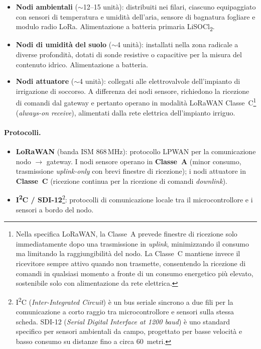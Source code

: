 \begin{itemize}
	\item \textbf{Nodi ambientali} ($\sim$12--15 unità): distribuiti nei filari, ciascuno equipaggiato con sensori di temperatura e umidità dell'aria, sensore di bagnatura fogliare e modulo radio LoRa. Alimentazione a batteria primaria LiSOCl\textsubscript{2}.

	\item \textbf{Nodi di umidità del suolo} ($\sim$4 unità): installati nella zona radicale a diverse profondità, dotati di sonde resistive o capacitive per la misura del contenuto idrico. Alimentazione a batteria.

	\item \textbf{Nodi attuatore} ($\sim$4 unità): collegati alle elettrovalvole dell'impianto di irrigazione di soccorso. A differenza dei nodi sensore, richiedono la ricezione di comandi dal gateway e pertanto operano in modalità LoRaWAN Classe~C\footnote{Nella specifica LoRaWAN, la Classe~A prevede finestre di ricezione solo immediatamente dopo una trasmissione in \textit{uplink}, minimizzando il consumo ma limitando la raggiungibilità del nodo. La Classe~C mantiene invece il ricevitore sempre attivo quando non trasmette, consentendo la ricezione di comandi in qualsiasi momento a fronte di un consumo energetico più elevato, sostenibile solo con alimentazione da rete elettrica.} (\textit{always-on receive}), alimentati dalla rete elettrica dell'impianto irriguo.
\end{itemize}

\paragraph{Protocolli.}

\begin{itemize}
	\item \textbf{LoRaWAN} (banda ISM 868\,MHz): protocollo LPWAN per la comunicazione nodo $\rightarrow$ gateway. I nodi sensore operano in \textbf{Classe~A} (minor consumo, trasmissione \textit{uplink-only} con brevi finestre di ricezione); i nodi attuatore in \textbf{Classe~C} (ricezione continua per la ricezione di comandi \textit{downlink}).
	\item \textbf{I\textsuperscript{2}C / SDI-12}\footnote{I\textsuperscript{2}C (\textit{Inter-Integrated Circuit}) è un bus seriale sincrono a due fili per la comunicazione a corto raggio tra microcontrollore e sensori sulla stessa scheda. SDI-12 (\textit{Serial Digital Interface at 1200 baud}) è uno standard specifico per sensori ambientali da campo, progettato per basse velocità e basso consumo su distanze fino a circa 60~metri.}: protocolli di comunicazione locale tra il microcontrollore e i sensori a bordo del nodo.
\end{itemize}


